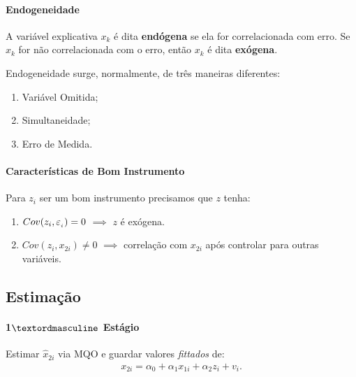 \documentclass[11pt, oneside, a4paper, article]{article}
\numberwithin{equation}{section}
\begin{document}
\begin{description}
\paragraph{Endogeneidade}
A variável explicativa $x_{k}$ é dita \textbf{endógena} se ela for correlacionada com erro.
Se $x_{k}$ for não correlacionada com o erro, então $x_{k}$ é dita \textbf{exógena}.

Endogeneidade surge, normalmente, de três maneiras diferentes:

\vspace{-1 em}
\begin{enumerate}[noitemsep]
\item Variável Omitida;
\item Simultaneidade;
\item Erro de Medida.
\end{enumerate}


\paragraph{Características de Bom Instrumento}

Para $z_{i}$ ser um bom instrumento precisamos que $z$ tenha:

\vspace{-1 em}
\begin{enumerate}[noitemsep]
\item $Cov(z_{i}, \varepsilon_{_i}) = 0$ $\implies$  $z$ é exógena.
\item $Cov(z_{i}, x_{2i}) \neq 0$ $\implies$  correlação com $x_{2i}$ após controlar para outras variáveis.
\end{enumerate}


\subsection{Estimação}

\paragraph{1$\textordmasculine$ Estágio}
Estimar $\hat{x}_{2i}$ via MQO e guardar valores \textit{fittados} de:
\begin{align*}
	x_{2i} = \alpha_{0} + \alpha_{1} x_{1i} + \alpha_{2} z_{i} + v_{i}.
\end{align*}


\end{description}
\end{document}
